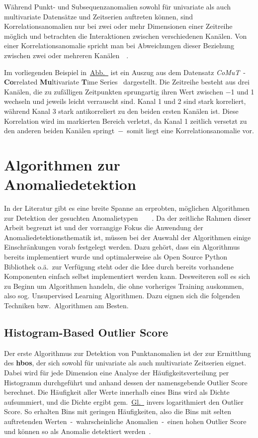 Während Punkt- und Subsequenzanomalien sowohl für univariate als auch multivariate Datensätze und Zeitserien auftreten können, sind
Korrelationsanomalien nur bei zwei oder mehr Dimensionen einer Zeitreihe möglich und betrachten die Interaktionen zwischen
verschiedenen Kanälen. Von einer Korrelationsanomalie spricht man bei Abweichungen dieser Beziehung zwischen zwei oder mehreren
Kanälen~\cite[S.12-13]{Wenig2024}~\cite{Wenig2024a}.

Im vorliegenden Beispiel in~\hyperref[fig:correlation_Anomaly]{Abb.~} ist ein Auszug aus dem Datensatz
\textit{CoMuT}~- \textbf{Co}rrelated \textbf{Mu}lti\-variate \textbf{T}ime Series~\cite{NaumannCoMuT} dargestellt. Die Zeitreihe besteht
aus drei Kanälen, die zu zufälligen Zeitpunkten sprungartig ihren Wert zwischen $-$1 und 1 wechseln und jeweils leicht verrauscht sind.
Kanal 1 und 2 sind stark korreliert, während Kanal 3 stark antikorreliert zu den beiden ersten Kanälen ist. Diese Korrelation wird im
markierten Bereich verletzt, da Kanal 1 zeitlich versetzt zu den anderen beiden Kanälen springt~$-$~somit liegt eine
Korrelations\-anomalie vor.

\section{Algorithmen zur Anomaliedetektion}\label{sec:algorithmen}
In der Literatur gibt es eine breite Spanne an erprobten, möglichen Algorithmen zur Detektion der gesuchten
Anomalietypen~\cite{Schmidl2022}~\cite{BlazquezGarcia2020}~\cite{Mane2022}~\cite{Wenig2024a}. Da der zeitliche Rahmen dieser Arbeit
begrenzt ist und der vorrangige Fokus die Anwendung der Anomaliedetektionsthematik ist, müssen bei der Auswahl der Algorithmen
einige Einschränkungen vorab festgelegt werden. Dazu gehört, dass ein Algorithmus bereits implementiert wurde und optimalerweise als Open
Source Python Bibliothek o.ä.~zur Verfügung steht oder die Idee durch bereits vorhandene Komponenten einfach selbst implementiert
werden kann. Desweiteren soll es sich zu Beginn um Algorithmen handeln, die ohne vorheriges Training
auskommen, also sog. Unsupervised Learning Algorithmen. Dazu eignen sich die folgenden Techniken bzw.~Algorithmen am Besten.

\subsection{Histogram-Based Outlier Score}
Der erste Algorithmus zur Detektion von Punktanomalien ist der zur Ermittlung des \textbf{\ac{hbos}}, der sich
sowohl für univariate als auch multivariate Zeitserien eignet. Dabei wird für jede Dimension eine Analyse der Häufigkeitsverteilung per
Histogramm durchgeführt und anhand dessen der namensgebende Outlier Score berechnet. Die Häufigkeit aller Werte innerhalb eines Bins wird als
Dichte aufsummiert, und die Dichte ergibt gem.~\hyperref[eq:hbos]{Gl.~} invers logarithmiert den Outlier Score. So erhalten Bins
mit geringen Häufigkeiten, also die Bins mit selten auftretenden Werten~-~wahrscheinliche Anomalien~-~einen hohen Outlier Score und können
so als Anomalie detektiert werden~\cite{Goldstein2012}.


